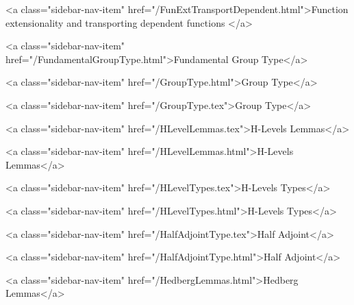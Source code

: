           <a class="sidebar-nav-item" href="/FunExtTransportDependent.html">Function extensionality and transporting dependent functions </a>
        
      
    
      
        
          <a class="sidebar-nav-item" href="/FundamentalGroupType.html">Fundamental Group Type</a>
        
      
    
      
        
          <a class="sidebar-nav-item" href="/GroupType.html">Group Type</a>
        
      
    
      
        
          <a class="sidebar-nav-item" href="/GroupType.tex">Group Type</a>
        
      
    
      
        
          <a class="sidebar-nav-item" href="/HLevelLemmas.tex">H-Levels Lemmas</a>
        
      
    
      
        
          <a class="sidebar-nav-item" href="/HLevelLemmas.html">H-Levels Lemmas</a>
        
      
    
      
        
          <a class="sidebar-nav-item" href="/HLevelTypes.tex">H-Levels Types</a>
        
      
    
      
        
          <a class="sidebar-nav-item" href="/HLevelTypes.html">H-Levels Types</a>
        
      
    
      
        
          <a class="sidebar-nav-item" href="/HalfAdjointType.tex">Half Adjoint</a>
        
      
    
      
        
          <a class="sidebar-nav-item" href="/HalfAdjointType.html">Half Adjoint</a>
        
      
    
      
        
          <a class="sidebar-nav-item" href="/HedbergLemmas.html">Hedberg Lemmas</a>
        
      
    
